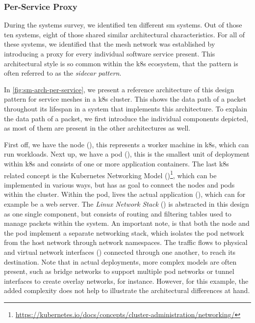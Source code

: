 \subsubsection{Per-Service Proxy}
\label{sec:survey:analysis:architectures:per-service}

During the systems survey, we identified ten different \gls{sm} systems. Out of those ten systems, eight of those shared similar architectural characteristics. For all of these systems, we identified that the mesh network was established by introducing a proxy for every individual software service present. This architectural style is so common within the \gls{k8s} ecosystem, that the pattern is often referred to as the \textit{sidecar pattern}.


In \cref{fig:sm-arch-per-service}, we present a reference architecture of this design pattern for service meshes in a \gls{k8s} cluster. This shows the data path of a packet throughout its lifespan in a system that implements this architecture. To explain the data path of a packet, we first introduce the individual components depicted, as most of them are present in the other architectures as well. 

    


First off, we have the node (), this represents a worker machine in \gls{k8s}, which can run workloads. Next up, we have a \gls{pod} (), this is the smallest unit of deployment within \gls{k8s} and consists of one or more application containers. The last \gls{k8s} related concept is the Kubernetes Networking Model ()\footnote{\url{https://kubernetes.io/docs/concepts/cluster-administration/networking/}}, which can be implemented in various ways, but has as goal to connect the nodes and pods within the cluster. Within the \gls{pod}, lives the actual application (), which can for example be a web server. The \textit{Linux Network Stack} () is abstracted in this design as one single component, but consists of routing and filtering tables used to manage packets within the system. An important note, is that both the node and the \gls{pod} implement a separate networking stack, which isolates the pod network from the host network through network namespaces. The traffic flows to physical and virtual network interfaces () connected through one another, to reach its destination. Note that in actual deployments, more complex models are often present, such as bridge networks to support multiple pod networks or tunnel interfaces to create overlay networks, for instance. However, for this example, the added complexity does not help to illustrate the architectural differences at hand.


